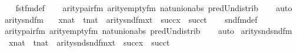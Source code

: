 \begin{isabellebody}
%
\isadelimproof
\ \ %
\endisadelimproof
%
\isatagproof
{}\isamarkupfalse%
\ fst{\isacharunderscore}{\kern0pt}fm{\isacharunderscore}{\kern0pt}def\isanewline
\ \ \isamarkupfalse%
\ arity{\isacharunderscore}{\kern0pt}pair{\isacharunderscore}{\kern0pt}fm\ arity{\isacharunderscore}{\kern0pt}empty{\isacharunderscore}{\kern0pt}fm\ nat{\isacharunderscore}{\kern0pt}union{\isacharunderscore}{\kern0pt}abs{}\ pred{\isacharunderscore}{\kern0pt}Un{\isacharunderscore}{\kern0pt}distrib\isanewline
\ \ \isamarkupfalse%
\ auto%
\endisatagproof
{\isafoldproof}%
%
\isadelimproof
\isanewline
%
\endisadelimproof
\isanewline
{}\isamarkupfalse%
\ arity{\isacharunderscore}{\kern0pt}snd{\isacharunderscore}{\kern0pt}fm\ {\isacharcolon}{\kern0pt}\isanewline
\ \ {\isachardoublequoteopen}{\isasymlbrakk}x{\isasymin}nat\ {\isacharsemicolon}{\kern0pt}\ t{\isasymin}nat{\isasymrbrakk}\ {\isasymLongrightarrow}\ arity{\isacharparenleft}{\kern0pt}snd{\isacharunderscore}{\kern0pt}fm{\isacharparenleft}{\kern0pt}x{\isacharcomma}{\kern0pt}t{\isacharparenright}{\kern0pt}{\isacharparenright}{\kern0pt}\ {\isacharequal}{\kern0pt}\ succ{\isacharparenleft}{\kern0pt}x{\isacharparenright}{\kern0pt}\ {\isasymunion}\ succ{\isacharparenleft}{\kern0pt}t{\isacharparenright}{\kern0pt}{\isachardoublequoteclose}\isanewline
%
\isadelimproof
\ \ %
\endisadelimproof
%
\isatagproof
{}\isamarkupfalse%
\ snd{\isacharunderscore}{\kern0pt}fm{\isacharunderscore}{\kern0pt}def\isanewline
\ \ \isamarkupfalse%
\ arity{\isacharunderscore}{\kern0pt}pair{\isacharunderscore}{\kern0pt}fm\ arity{\isacharunderscore}{\kern0pt}empty{\isacharunderscore}{\kern0pt}fm\ nat{\isacharunderscore}{\kern0pt}union{\isacharunderscore}{\kern0pt}abs{}\ pred{\isacharunderscore}{\kern0pt}Un{\isacharunderscore}{\kern0pt}distrib\isanewline
\ \ \isamarkupfalse%
\ auto%
\endisatagproof
{\isafoldproof}%
%
\isadelimproof
\isanewline
%
\endisadelimproof
\isanewline
{}\isamarkupfalse%
\ arity{\isacharunderscore}{\kern0pt}snd{\isacharunderscore}{\kern0pt}snd{\isacharunderscore}{\kern0pt}fm\ {\isacharcolon}{\kern0pt}\isanewline
\ \ {\isachardoublequoteopen}{\isasymlbrakk}x{\isasymin}nat\ {\isacharsemicolon}{\kern0pt}\ t{\isasymin}nat{\isasymrbrakk}\ {\isasymLongrightarrow}\ arity{\isacharparenleft}{\kern0pt}snd{\isacharunderscore}{\kern0pt}snd{\isacharunderscore}{\kern0pt}fm{\isacharparenleft}{\kern0pt}x{\isacharcomma}{\kern0pt}t{\isacharparenright}{\kern0pt}{\isacharparenright}{\kern0pt}\ {\isacharequal}{\kern0pt}\ succ{\isacharparenleft}{\kern0pt}x{\isacharparenright}{\kern0pt}\ {\isasymunion}\ succ{\isacharparenleft}{\kern0pt}t{\isacharparenright}{\kern0pt}{\isachardoublequoteclose}\isanewline

\end{isabellebody}

